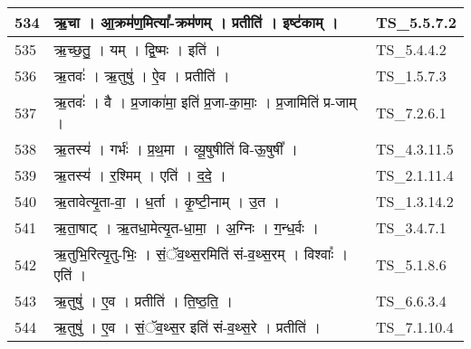 \documentclass[17pt]{extarticle}
\begin{document}
\begin{longtable}{||p{0.4in}||p{4.9in}||p{0.9in}||}
    \hline
        
    534 & ऋ॒चा   ।   आ॒क्रम॑ण॒मित्या᳚{-}क्रम॑णम्   ।   प्रतीति॑   ।   इष्ट॑काम्   ।    & TS\_5.5.7.2       \\
    
    \hline
        
    535 & ऋ॒च्छ॒तु॒   ।   यम्   ।   द्वि॒ष्मः   ।   इति॑   ।    & TS\_5.4.4.2       \\
    
    \hline
        
    536 & ऋ॒तवः॑   ।   ऋ॒तुषु॑   ।   ऐ॒व   ।   प्रतीति॑   ।    & TS\_1.5.7.3       \\
    
    \hline
        
    537 & ऋ॒तवः॑   ।   वै   ।   प्र॒जाका॑मा॒ इति॑ प्र॒जा{-}का॒माः॒   ।   प्र॒जामिति॑ प्र{-}जाम्   ।    & TS\_7.2.6.1       \\
    
    \hline
        
    538 & ऋ॒तस्य॑   ।   गर्भः॑   ।   प्र॒थ॒मा   ।   व्यू॒षुषीति॑ वि{-}ऊ॒षुषी᳚   ।    & TS\_4.3.11.5       \\
    
    \hline
        
    539 & ऋ॒तस्य॑   ।   र॒श्मिम्   ।   एति॑   ।   द॒दे॒   ।    & TS\_2.1.11.4       \\
    
    \hline
        
    540 & ऋ॒तावेत्यृ॒ता{-}वा॒   ।   ध॒र्ता   ।   कृ॒ष्टी॒नाम्   ।   उ॒त   ।    & TS\_1.3.14.2       \\
    
    \hline
        
    541 & ऋ॒ता॒षाट्   ।   ऋ॒तधा॒मेत्यृ॒त{-}धा॒मा॒   ।   अ॒ग्निः   ।   ग॒न्ध॒र्वः   ।    & TS\_3.4.7.1       \\
    
    \hline
        
    542 & ऋ॒तुभि॒रित्यृ॒तु{-}भिः॒   ।   सं॒ॅव॒थ्स॒रमिति॑ सं{-}व॒थ्स॒रम्   ।   विश्वाः᳚   ।   एति॑   ।    & TS\_5.1.8.6       \\
    
    \hline
        
    543 & ऋ॒तुषु॑   ।   ए॒व   ।   प्रतीति॑   ।   ति॒ष्ठ॒ति॒   ।    & TS\_6.6.3.4       \\
    
    \hline
        
    544 & ऋ॒तुषु॑   ।   ए॒व   ।   सं॒ॅव॒थ्स॒र इति॑ सं{-}व॒थ्स॒रे   ।   प्रतीति॑   ।    & TS\_7.1.10.4       \\
    

\end{longtable}
\end{document}
